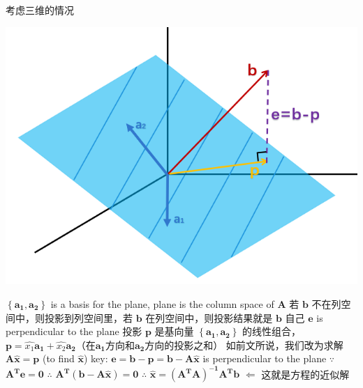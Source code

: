 \documentclass[12pt, a4paper]{article}
\begin{document}
{考虑三维的情况
\begin{center}
	\includegraphics[scale=0.8]{figures/S15-2.png}
\end{center}
$\left\{{\mathbf{a_1}}, {\mathbf{a_2}}\right\}$ is a basis for the plane, plane is the column space of ${\mathbf{A}}$
\newline
若 ${\mathbf{b}}$ 不在列空间中，则投影到列空间里，若 ${\mathbf{b}}$ 在列空间中，则投影结果就是 ${\mathbf{b}}$ 自己
\newline
${\mathbf{e}}$ is perpendicular to the plane
\newline
投影 ${\mathbf{p}}$ 是基向量 $\left\{{\mathbf{a_1}}, {\mathbf{a_2}}\right\}$ 的线性组合，${\mathbf{p}} = \hat{x_1}{\mathbf{a_1}} + \hat{x_2}{\mathbf{a_2}}$（在${\mathbf{a_1}}$方向和${\mathbf{a_2}}$方向的投影之和）
\vspace{31pt}
\newline
如前文所说，我们改为求解 ${\mathbf{A}}{\mathbf{\hat{x}}}={\mathbf{p}}$ (to find ${\mathbf{\hat{x}}}$)
\newline
key: ${\mathbf{e}}={\mathbf{b}}-{\mathbf{p}}={\mathbf{b}}-{\mathbf{A}}{\mathbf{\hat{x}}}$ is perpendicular to the plane
\newline
$\because$ ${\mathbf{A^{T}}}{\mathbf{e}} = {\mathbf{0}}$
\newline
$\therefore$ ${\mathbf{A^{T}}}({\mathbf{b}}-{\mathbf{A}}{\mathbf{\hat{x}}}) = {\mathbf{0}}$
\newline
$\therefore$ ${\mathbf{\hat{x}}} = {\mathbf{({\mathbf{A^{T}}}{\mathbf{A}})^{-1}}} {\mathbf{A^{T}}}{\mathbf{b}}$ \quad $\Longleftarrow$ 这就是方程的近似解
\newline
\begin{math}

\end{math}}
\end{document}
